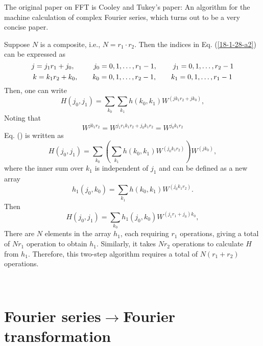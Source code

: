 \documentclass{article}
\begin{document}
The original paper on FFT is Cooley and Tukey's paper: An algorithm for the
machine calculation of complex Fourier series, which turns out to be a very
concise paper.

Suppose $N$ is a composite, i.e., $N = r_1 \cdot r_2$. Then the indices in Eq.
(\ref{18-1-28-a2}) can be expressed as
\begin{equation}
  j = j_1 r_1 + j_0, \hspace{2.6em} j_0 = 0, 1, \ldots, r_1 - 1,
  \hspace{2.2em} j_1 = 0, 1, \ldots, r_2 - 1
\end{equation}
\begin{equation}
  k = k_1 r_2 + k_0, \hspace{2.0em} k_0 = 0, 1, \ldots, r_2 - 1,
  \hspace{2.0em} k_1 = 0, 1, \ldots, r_1 - 1
\end{equation}
Then, one can write
\begin{equation}
  H (j_0, j_1) = \sum_{k_0} \sum_{k_1} h (k_0, k_1) W^{(j k_1 r_2 + j k_0)},
\end{equation}
Noting that
\begin{equation}
  W^{j k_1 r_2} = W^{j_1 r_1 k_1 r_2 + j_0 k_1 r_2} = W^{j_0 k_1 r_2}
\end{equation}
Eq. () is written as
\begin{equation}
  H (j_0, j_1) = \sum_{k_0} \left( \sum_{k_1} h (k_0, k_1) W^{(j_0 k_1 r_2)}
  \right) W^{(j k_0)},
\end{equation}
where the inner sum over $k_1$ is independent of $j_1$ and can be defined as a
new array
\begin{equation}
  h_1 (j_0, k_0) = \sum_{k_1} h (k_0, k_1) W^{(j_0 k_1 r_2)} .
\end{equation}
Then
\begin{equation}
  H (j_0, j_1) = \sum_{k_0} h_1 (j_0, k_0) W^{(j_1 r_1 + j_0) k_0},
\end{equation}
There are $N$ elements in the array $h_1$, each requiring $r_1$ operations,
giving a total of $N r_1$ operation to obtain $h_1$. Similarly, it takes $N
r_2$ operations to calculate $H$ from $h_1$. Therefore, this two-step
algorithm requires a total of $N (r_1 + r_2)$ operations.

\

\section{Fourier series$\rightarrow$Fourier transformation}
\end{document}
